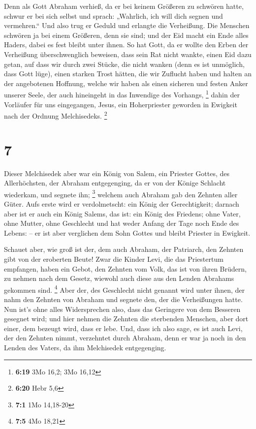 Denn als Gott Abraham verhieß, da er bei keinem Größeren
zu schwören hatte, schwur er bei sich selbst  und sprach:
„Wahrlich, ich will dich segnen und vermehren.``  Und
also trug er Geduld und erlangte die Verheißung.  Die
Menschen schwören ja bei einem Größeren, denn sie sind; und der Eid
macht ein Ende alles Haders, dabei es fest bleibt unter ihnen.
 So hat Gott, da er wollte den Erben der Verheißung
überschwenglich beweisen, dass sein Rat nicht wankte, einen Eid dazu
getan,  auf dass wir durch zwei Stücke, die nicht wanken
(denn es ist unmöglich, dass Gott lüge), einen starken Trost hätten, die
wir Zuflucht haben und halten an der angebotenen Hoffnung,
 welche wir haben als einen sicheren und festen Anker
unserer Seele, der auch hineingeht in das Inwendige des Vorhangs,
\footnote{\textbf{6:19} 3Mo 16,2; 3Mo 16,12}  dahin der
Vorläufer für uns eingegangen, Jesus, ein Hoherpriester geworden in
Ewigkeit nach der Ordnung Melchisedeks. \footnote{\textbf{6:20} Hebr 5,6}

\hypertarget{section-3}{%
\section{7}\label{section-3}}

 Dieser Melchisedek aber war ein König von Salem, ein
Priester Gottes, des Allerhöchsten, der Abraham entgegenging, da er von
der Könige Schlacht wiederkam, und segnete ihn; \footnote{\textbf{7:1}
  1Mo 14,18-20}  welchem auch Abraham gab den Zehnten
aller Güter. Aufs erste wird er verdolmetscht: ein König der
Gerechtigkeit; darnach aber ist er auch ein König Salems, das ist: ein
König des Friedens;  ohne Vater, ohne Mutter, ohne
Geschlecht und hat weder Anfang der Tage noch Ende des Lebens: -- er ist
aber verglichen dem Sohn Gottes und bleibt Priester in Ewigkeit.

 Schauet aber, wie groß ist der, dem auch Abraham, der
Patriarch, den Zehnten gibt von der eroberten Beute!  Zwar
die Kinder Levi, die das Priestertum empfangen, haben ein Gebot, den
Zehnten vom Volk, das ist von ihren Brüdern, zu nehmen nach dem Gesetz,
wiewohl auch diese aus den Lenden Abrahams gekommen sind. \footnote{\textbf{7:5}
  4Mo 18,21}  Aber der, des Geschlecht nicht genannt wird
unter ihnen, der nahm den Zehnten von Abraham und segnete den, der die
Verheißungen hatte.  Nun ist's ohne alles Widersprechen
also, dass das Geringere von dem Besseren gesegnet wird; 
und hier nehmen die Zehnten die sterbenden Menschen, aber dort einer,
dem bezeugt wird, dass er lebe.  Und, dass ich also sage,
es ist auch Levi, der den Zehnten nimmt, verzehntet durch Abraham,
 denn er war ja noch in den Lenden des Vaters, da ihm
Melchisedek entgegenging.

